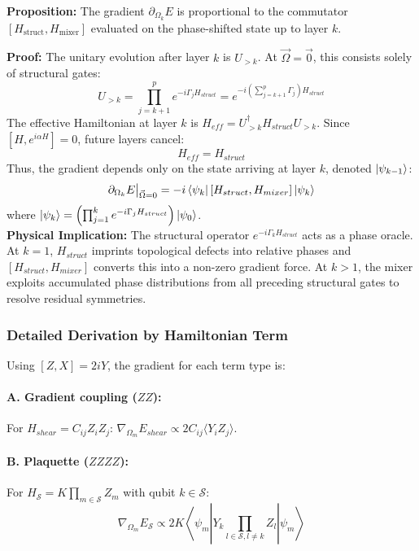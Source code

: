 \documentclass[12pt, a4paper, oneside]{report}
\begin{document}
\textbf{Proposition:} The gradient $\partial_{\Omega_k} E$ is proportional to the commutator $[H_{\text{struct}}, H_{\text{mixer}}]$ evaluated on the phase-shifted state up to layer $k$.

\textbf{Proof:}
The unitary evolution after layer $k$ is $U_{>k}$. At $\vec{\Omega}=\vec{0}$, this consists solely of structural gates:
\begin{equation}
    U_{>k} = \prod_{j=k+1}^p e^{-i\Gamma_j H_{struct}} = e^{-i (\sum_{j=k+1}^p \Gamma_j) H_{struct}}
\end{equation}
The effective Hamiltonian at layer $k$ is $H_{eff} = U_{>k}^\dagger H_{struct} U_{>k}$. Since $[H, e^{i\alpha H}] = 0$, future layers cancel:
\begin{equation}
    H_{eff} = H_{struct}
\end{equation}
Thus, the gradient depends only on the state arriving at layer $k$, denoted $\ket{\psi_{k-1}}$:
\begin{equation}
    \partial_{\Omega_k} E \big|_{\vec{\Omega}=0} = -i \bra{\psi_{k}} [H_{struct}, H_{mixer}] \ket{\psi_{k}}
\label{eq:mixer-gradient}
\end{equation}
where $\ket{\psi_{k}} = \left( \prod_{j=1}^{k} e^{-i\Gamma_j H_{struct}} \right) \ket{\psi_0}$.\\

\noindent\textbf{Physical Implication:} The structural operator $e^{-i\Gamma_k H_{struct}}$ acts as a phase oracle. At $k=1$, $H_{struct}$ imprints topological defects into relative phases and $[H_{struct}, H_{mixer}]$ converts this into a non-zero gradient force. At $k>1$, the mixer exploits accumulated phase distributions from all preceding structural gates to resolve residual symmetries.


\subsubsection{Detailed Derivation by Hamiltonian Term}
Using $[Z, X] = 2iY$, the gradient for each term type is:

\paragraph{A. Gradient coupling ($ZZ$):} For $H_{shear} = C_{ij} Z_i Z_j$: $\nabla_{\Omega_m} E_{shear} \propto 2 C_{ij} \langle Y_i Z_j \rangle$.

\paragraph{B. Plaquette ($ZZZZ$):} For $H_{\mathcal{S}} = K \prod_{m \in \mathcal{S}} Z_m$ with qubit $k \in \mathcal{S}$:
\begin{equation}
    \nabla_{\Omega_m} E_{\mathcal{S}} \propto 2 K \left\langle \psi_m \left| Y_k \prod_{l \in \mathcal{S}, l \neq k} Z_l \right| \psi_m\right\rangle
\end{equation}
\end{document}
